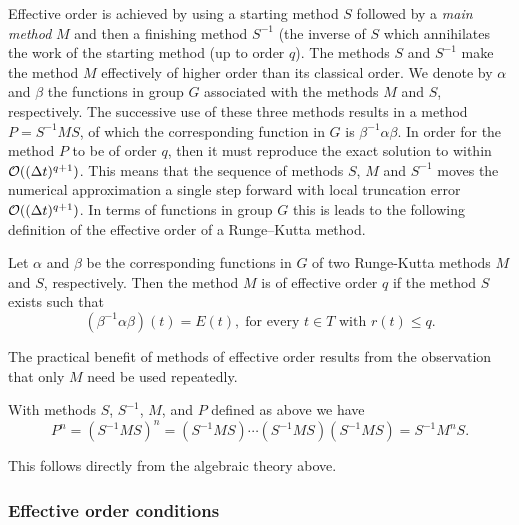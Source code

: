Effective order is achieved by using a starting method $S$ followed by a \emph{main method} $M$ %
and then a finishing method $S^{-1}$ (the inverse of $S$ which annihilates the work of the starting method (up to order $q$).
The methods $S$ and $S^{-1}$ make the method $M$ effectively of higher order than its classical order.
We denote by $\alpha$ and $\beta$ the functions in group $G$ associated with the methods $M$ and $S$, respectively.
The successive use of these three methods results in a method $P = S^{-1}MS$, of which the corresponding function in $G$ is $\beta^{-1}\alpha\beta$.
In order for the method $P$ to be of order $q$, then it must reproduce the exact solution to within $\mathcal{O}((\Delta t)^{q+1})$.
This means that the sequence of methods \( S \), \( M \) and \( S^{-1} \) moves the numerical approximation a single step forward with local truncation error \( \mathcal{O}((\Delta t)^{q+1}) \).
In terms of functions in group $G$ this is leads to the following definition of the effective order of a Runge--Kutta method.
\begin{definition}\cite{Butcher1987_book}\label{def:Effective_order}
	Let $\alpha$ and $\beta$ be the corresponding functions in $G$ of two Runge-Kutta methods $M$ and $S$, respectively. Then the method $M$ is of effective order $q$ if the method $S$ exists such that
	\begin{equation}\label{eq:Effective_order_1}
		(\beta^{-1}\alpha\beta)(t) = E(t), \; \text{for every } t \in T \text{ with } r(t) \leq q.
	\end{equation}
\end{definition}
The practical benefit of methods of effective order results from the observation that only $M$ need be used repeatedly.
\begin{theorem}
  With methods $S$, $S^{-1}$, $M$, and $P$ defined as above we have
$$P^n = (S^{-1}MS)^n = (S^{-1}MS)\cdots(S^{-1}MS)(S^{-1}MS) = S^{-1}M^nS.$$
\end{theorem}
This follows directly from the algebraic theory above.



\subsubsection{Effective order conditions}\label{sec:effOrderCond}

